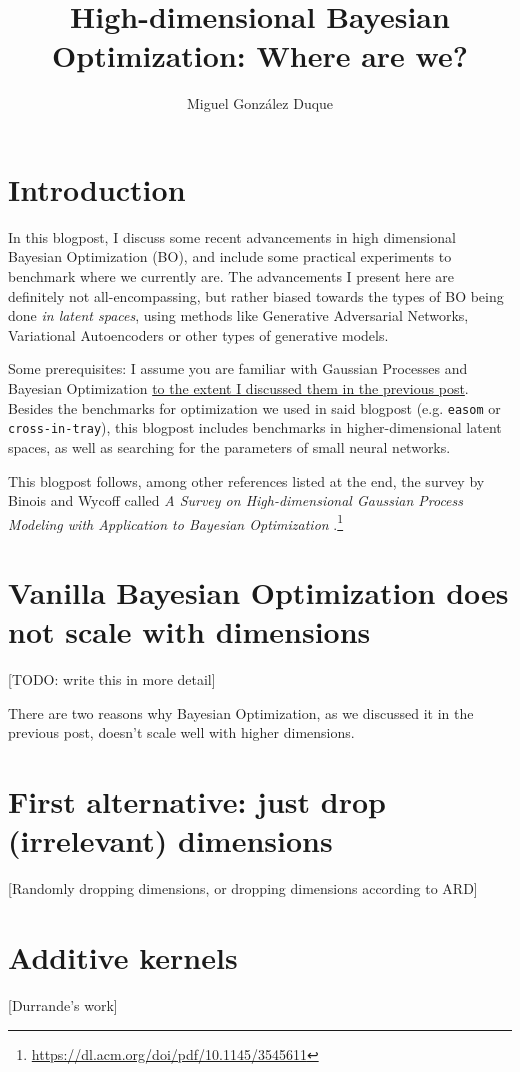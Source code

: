 \documentclass{article}
\title{High-dimensional Bayesian Optimization: Where are we?}
\author{Miguel González Duque}
\date{}
\begin{document}
\maketitle

\section*{Introduction}

In this blogpost, I discuss some recent advancements in high dimensional Bayesian Optimization (BO), and include some practical experiments to benchmark where we currently are. The advancements I present here are definitely not all-encompassing, but rather biased towards the types of BO being done \textit{in latent spaces}, using methods like Generative Adversarial Networks, Variational Autoencoders or other types of generative models.

Some prerequisites: I assume you are familiar with Gaussian Processes and Bayesian Optimization \href{https://www.miguelgondu.com/blogposts/2023-07-31/intro-to-bo/}{to the extent I discussed them in the previous post}. Besides the benchmarks for optimization we used in said blogpost (e.g. \texttt{easom} or \texttt{cross-in-tray}), this blogpost includes benchmarks in higher-dimensional latent spaces, as well as searching for the parameters of small neural networks.

This blogpost follows, among other references listed at the end, the survey by Binois and Wycoff called \textit{A Survey on High-dimensional Gaussian Process Modeling with Application to Bayesian Optimization} \cite{BinoisWycoff:high-dimensional-bo:2022}.\footnote{\url{https://dl.acm.org/doi/pdf/10.1145/3545611}}

\section*{Vanilla Bayesian Optimization does not scale with dimensions}

[TODO: write this in more detail]

There are two reasons why Bayesian Optimization, as we discussed it in the previous post, doesn't scale well with higher dimensions.

\section*{First alternative: just drop (irrelevant) dimensions}

[Randomly dropping dimensions, or dropping dimensions according to ARD]

\section*{Additive kernels}

[Durrande's work]





\end{document}
